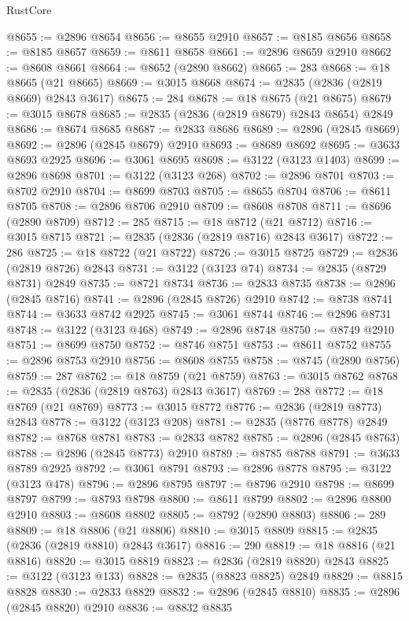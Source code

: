 \begin{lexlean}{RustCore}
\begin{coremodule}
@8655 := @2896 @8654
@8656 := @8655 @2910
@8657 := @8185 @8656
@8658 := @8185 @8657
@8659 := @8611 @8658
@8661 := @2896 @8659 @2910
@8662 := @8608 @8661
@8664 := @8652 (@2890 @8662)
@8665 := 283
@8668 := @18 @8665 (@21 @8665)
@8669 := @3015 @8668
@8674 := @2835 (@2836 (@2819 @8669) @2843 @3617)
@8675 := 284
@8678 := @18 @8675 (@21 @8675)
@8679 := @3015 @8678
@8685 := @2835 (@2836 (@2819 @8679) @2843 @8654) @2849
@8686 := @8674 @8685
@8687 := @2833 @8686
@8689 := @2896 (@2845 @8669)
@8692 := @2896 (@2845 @8679) @2910
@8693 := @8689 @8692
@8695 := @3633 @8693 @2925
@8696 := @3061 @8695
@8698 := @3122 (@3123 @1403)
@8699 := @2896 @8698
@8701 := @3122 (@3123 @268)
@8702 := @2896 @8701
@8703 := @8702 @2910
@8704 := @8699 @8703
@8705 := @8655 @8704
@8706 := @8611 @8705
@8708 := @2896 @8706 @2910
@8709 := @8608 @8708
@8711 := @8696 (@2890 @8709)
@8712 := 285
@8715 := @18 @8712 (@21 @8712)
@8716 := @3015 @8715
@8721 := @2835 (@2836 (@2819 @8716) @2843 @3617)
@8722 := 286
@8725 := @18 @8722 (@21 @8722)
@8726 := @3015 @8725
@8729 := @2836 (@2819 @8726) @2843
@8731 := @3122 (@3123 @74)
@8734 := @2835 (@8729 @8731) @2849
@8735 := @8721 @8734
@8736 := @2833 @8735
@8738 := @2896 (@2845 @8716)
@8741 := @2896 (@2845 @8726) @2910
@8742 := @8738 @8741
@8744 := @3633 @8742 @2925
@8745 := @3061 @8744
@8746 := @2896 @8731
@8748 := @3122 (@3123 @468)
@8749 := @2896 @8748
@8750 := @8749 @2910
@8751 := @8699 @8750
@8752 := @8746 @8751
@8753 := @8611 @8752
@8755 := @2896 @8753 @2910
@8756 := @8608 @8755
@8758 := @8745 (@2890 @8756)
@8759 := 287
@8762 := @18 @8759 (@21 @8759)
@8763 := @3015 @8762
@8768 := @2835 (@2836 (@2819 @8763) @2843 @3617)
@8769 := 288
@8772 := @18 @8769 (@21 @8769)
@8773 := @3015 @8772
@8776 := @2836 (@2819 @8773) @2843
@8778 := @3122 (@3123 @208)
@8781 := @2835 (@8776 @8778) @2849
@8782 := @8768 @8781
@8783 := @2833 @8782
@8785 := @2896 (@2845 @8763)
@8788 := @2896 (@2845 @8773) @2910
@8789 := @8785 @8788
@8791 := @3633 @8789 @2925
@8792 := @3061 @8791
@8793 := @2896 @8778
@8795 := @3122 (@3123 @478)
@8796 := @2896 @8795
@8797 := @8796 @2910
@8798 := @8699 @8797
@8799 := @8793 @8798
@8800 := @8611 @8799
@8802 := @2896 @8800 @2910
@8803 := @8608 @8802
@8805 := @8792 (@2890 @8803)
@8806 := 289
@8809 := @18 @8806 (@21 @8806)
@8810 := @3015 @8809
@8815 := @2835 (@2836 (@2819 @8810) @2843 @3617)
@8816 := 290
@8819 := @18 @8816 (@21 @8816)
@8820 := @3015 @8819
@8823 := @2836 (@2819 @8820) @2843
@8825 := @3122 (@3123 @133)
@8828 := @2835 (@8823 @8825) @2849
@8829 := @8815 @8828
@8830 := @2833 @8829
@8832 := @2896 (@2845 @8810)
@8835 := @2896 (@2845 @8820) @2910
@8836 := @8832 @8835

\end{coremodule}
\end{lexlean}
